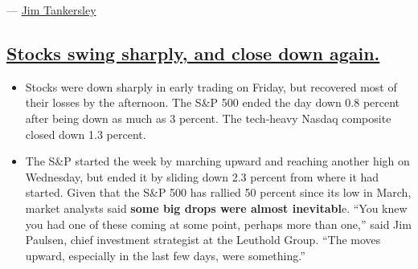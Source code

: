 --- \href{https://www.nytimes3xbfgragh.onion/by/jim-tankersley}{Jim
Tankersley}

\hypertarget{stocks-swing-sharply-and-close-down-again}{%
\subsection{\texorpdfstring{\protect\hyperlink{stocks-swing-sharply-and-close-down-again}{Stocks
swing sharply, and close down
again.}}{Stocks swing sharply, and close down again.}}\label{stocks-swing-sharply-and-close-down-again}}

\begin{itemize}
\item
  Stocks were down sharply in early trading on Friday, but recovered
  most of their losses by the afternoon. The S\&P 500 ended the day down
  0.8 percent after being down as much as 3 percent. The tech-heavy
  Nasdaq composite closed down 1.3 percent.
\item
  The S\&P started the week by marching upward and reaching another high
  on Wednesday, but ended it by sliding down 2.3 percent from where it
  had started. Given that the S\&P 500 has rallied 50 percent since its
  low in March, market analysts said \textbf{some big drops were almost
  inevitabl}e. ``You knew you had one of these coming at some point,
  perhaps more than one,'' said Jim Paulsen, chief investment strategist
  at the Leuthold Group. ``The moves upward, especially in the last few
  days, were something.''


\end{itemize}
